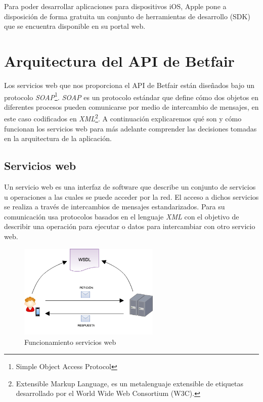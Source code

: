 Para poder desarrollar aplicaciones para dispositivos iOS, Apple pone a disposición de forma gratuita un conjunto de herramientas de desarrollo (SDK) que se encuentra disponible en su portal web. 

\section{Arquitectura del API de Betfair}

	Los servicios web que nos proporciona el API de Betfair están diseñados bajo un protocolo \emph{SOAP}\footnote{Simple Object Access Protocol}. \emph{SOAP} es un protocolo estándar que define cómo dos objetos en diferentes procesos pueden comunicarse por medio de intercambio de mensajes, en este caso codificados en \emph{XML}\footnote{Extensible Markup Language, es un metalenguaje extensible de etiquetas desarrollado por el World Wide Web Consortium (W3C).}. A continuación explicaremos qué son y cómo funcionan los servicios web para más adelante comprender las decisiones tomadas en la arquitectura de la aplicación.


\subsection{Servicios web}

         Un servicio web es una interfaz de software que describe un conjunto de servicios u operaciones a las cuales se puede acceder por la red. El acceso a dichos servicios se realiza a través de intercambios de mensajes estandarizados. Para su comunicación usa protocolos basados en el lenguaje \emph{XML} con el objetivo de describir una operación para ejecutar o datos para intercambiar con otro servicio web.  
 
\begin{figure} [h]
  \centering
    \includegraphics[width=0.6\textwidth]{./images/webservice.png}
  \caption{Funcionamiento servicios web}
  \label{fig:servicioweb}
\end{figure}
         
